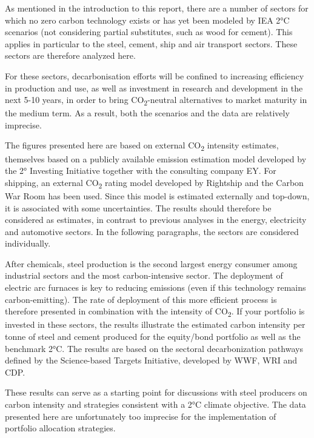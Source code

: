 \documentclass[10pt,table,a4]{article}\usepackage[]{graphicx}\usepackage[]{color}
\begin{document}
		\begin{multicols}{2}
			As mentioned in the introduction to this report, there are a number of sectors for which no zero carbon technology exists or has yet been modeled by IEA 2°C scenarios (not considering partial substitutes, such as wood for cement). This applies in particular to the steel, cement, ship and air transport sectors. These sectors are therefore analyzed here.
			
			For these sectors, decarbonisation efforts will be confined to increasing efficiency in production and use, as well as investment in research and 	development in the next 5-10 years, in order to bring CO\textsubscript{2}-neutral alternatives to market maturity in the medium term. As a result, both the scenarios and the data are relatively imprecise.
			
			The figures presented here are based on external CO\textsubscript{2} intensity estimates, themselves based on a publicly available emission estimation model developed by the 2° Investing Initiative together with the consulting company EY. For shipping, an external CO\textsubscript{2} rating model developed by 	Rightship and the Carbon War Room has been used. Since this model is estimated externally and top-down, it is associated with some uncertainties. The results should therefore be considered as estimates, in contrast to previous analyses in the energy, electricity and automotive sectors. In the following paragraphs, the sectors are considered individually.
			
			After chemicals, steel production is the second largest energy consumer among industrial sectors and the most carbon-intensive sector. The deployment of 	electric arc furnaces is key to reducing emissions (even if this technology remains carbon-emitting). The rate of deployment of this more efficient process is therefore presented in combination with the intensity of CO\textsubscript{2}. If your portfolio is invested in these sectors, the results illustrate the estimated carbon intensity per tonne of steel and cement produced for the equity/bond portfolio as well as the benchmark 2°C. The results are based on the sectoral decarbonization pathways defined by the Science-based Targets Initiative, developed by WWF, WRI and CDP.
			
			These results can serve as a starting point for discussions with steel producers on carbon intensity and strategies consistent with a 2°C climate 	objective. The data presented here are unfortunately too imprecise for the implementation of portfolio allocation strategies.
			
			\end{multicols}
		
\end{document}
